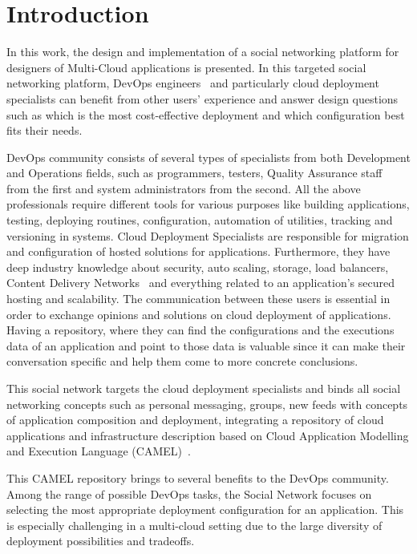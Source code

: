 \chapter{Introduction}
In this work, the design and implementation of a social networking platform for designers of Multi-Cloud applications is presented. In this targeted social networking platform, DevOps engineers~\cite{loukides2012devops} and particularly cloud deployment specialists can benefit from other users' experience and answer design questions such as which is the most cost-effective deployment and which configuration best fits their needs. 

DevOps community consists of several types of specialists from both Development and Operations fields, such as programmers, testers, Quality Assurance staff~\cite{rossberg2014collaboration} from the first and system administrators from the second.  All the above professionals require different tools for various purposes like building applications, testing, deploying routines, configuration, automation of utilities, tracking and versioning in systems.  
Cloud Deployment Specialists are responsible for migration and configuration of hosted solutions for applications. Furthermore, they have deep industry knowledge about security, auto scaling, storage, load balancers, Content Delivery Networks~\cite{buyya2008content} and everything related to an application's secured hosting and scalability. The communication between these users is essential in order to exchange opinions and solutions on cloud deployment of applications. Having a repository, where they can find the configurations and the executions data of an application and point to those data is valuable since it can make their conversation specific and help them come to more concrete conclusions.

This social network targets the cloud deployment specialists and binds all social networking concepts such as personal messaging, groups, new feeds with concepts of application composition and deployment, integrating a repository of cloud applications and infrastructure description based on Cloud Application Modelling and Execution Language (CAMEL)~\cite{paasagedeliverable212}. 

This CAMEL repository brings to several benefits to the DevOps community.
Among the range of possible DevOps tasks, the Social Network focuses on selecting the most appropriate deployment
configuration for an application. This is especially challenging in a multi-cloud setting due to the
large diversity of deployment possibilities and tradeoffs. 

